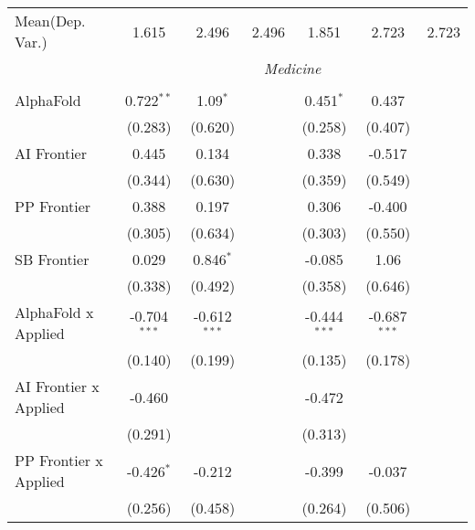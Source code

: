 \begin{tabular}{lcccccc}
Mean(Dep. Var.) & 1.615 & 2.496 & 2.496 & 1.851 & 2.723 & 2.723 \\
 & \multicolumn{6}{c}{\textit{Medicine}} \\ \\
   AlphaFold                      & 0.722$^{**}$   & 1.09$^{*}$     &                & 0.451$^{*}$    & 0.437          &   \\   
                                  & (0.283)        & (0.620)        &                & (0.258)        & (0.407)        &   \\   
   AI Frontier                    & 0.445          & 0.134          &                & 0.338          & -0.517         &   \\   
                                  & (0.344)        & (0.630)        &                & (0.359)        & (0.549)        &   \\   
   PP Frontier                    & 0.388          & 0.197          &                & 0.306          & -0.400         &   \\   
                                  & (0.305)        & (0.634)        &                & (0.303)        & (0.550)        &   \\   
   SB Frontier                    & 0.029          & 0.846$^{*}$    &                & -0.085         & 1.06           &   \\   
                                  & (0.338)        & (0.492)        &                & (0.358)        & (0.646)        &   \\   
   AlphaFold x Applied            & -0.704$^{***}$ & -0.612$^{***}$ &                & -0.444$^{***}$ & -0.687$^{***}$ &   \\   
                                  & (0.140)        & (0.199)        &                & (0.135)        & (0.178)        &   \\   
   AI Frontier x Applied          & -0.460         &                &                & -0.472         &                &   \\   
                                  & (0.291)        &                &                & (0.313)        &                &   \\   
   PP Frontier x Applied          & -0.426$^{*}$   & -0.212         &                & -0.399         & -0.037         &   \\   
                                  & (0.256)        & (0.458)        &                & (0.264)        & (0.506)        &   \\   

\end{tabular}
